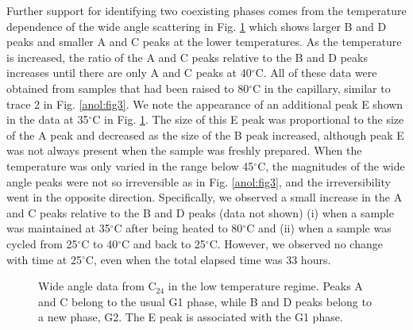 Further support for identifying two coexisting phases comes from the 
temperature dependence of the wide angle scattering in 
Fig. \ref{anol:fig4} which shows
larger B and D peaks and smaller A and C peaks at the lower temperatures.
As the temperature is increased, the ratio of the A and C peaks relative
to the B and D peaks increases until there are only A and C peaks at 
40$^{\circ}$C. All of these data were obtained from samples that had been 
raised to 80$^{\circ}$C in the capillary, similar to trace 2 in 
Fig. \ref{anol:fig3}.  
We note the appearance of an additional peak E shown in the data at 
35$^{\circ}$C in Fig. \ref{anol:fig4}.  The size of this E peak was 
proportional to the 
size of the A peak and decreased as the size of the B peak increased, although 
peak E was not always present when the sample was freshly prepared.
When the temperature was only varied in the range below 45$^{\circ}$C, the 
magnitudes of the wide angle peaks were not so irreversible as in 
Fig. \ref{anol:fig3}, and 
the irreversibility went in the opposite direction.  Specifically, we observed 
a small increase in the A and C peaks relative to the B and D peaks 
(data not shown) (i) when a sample was maintained at 35$^{\circ}$C after being 
heated to 80$^{\circ}$C and (ii) when a sample was cycled from 25$^{\circ}$C to 
40$^{\circ}$C and back to 25$^{\circ}$C.  However, we observed no change with
time at 25$^{\circ}$C, even when the total elapsed time was 33 hours.

\begin{figure}[t]
\centerline {}
\caption{Wide angle data from C$_{24}$ in the low temperature regime. Peaks
A and C belong to the usual G1 phase, while B and D peaks belong to a new
phase, G2. The E peak is associated with the G1 phase.
\label{anol:fig4}}
\end{figure}

